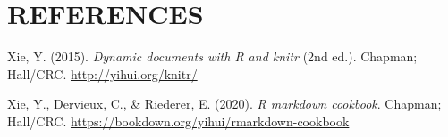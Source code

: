 \documentclass{source/tex/templates/maththesis}
\newlength{\cslhangindent}
\newenvironment{CSLReferences}[2] %
 {%
  \setlength{\parindent}{0pt}
  \ifodd #1
  \let\oldpar\par
  \def\par{\hangindent=\cslhangindent\oldpar}
  \fi
  \setlength{\parskip}{1mm}
  \setlength{\baselineskip}{6mm}
 }%
 {}
\begin{document}
\hypertarget{references}{%
\chapter*{REFERENCES}\label{references}}

\hypertarget{refs}{}
\begin{CSLReferences}{1}{0}
\leavevmode{}%
Xie, Y. (2015). \emph{Dynamic documents with {R} and knitr} (2nd ed.). Chapman; Hall/CRC. \url{http://yihui.org/knitr/}

\leavevmode{}%
Xie, Y., Dervieux, C., \& Riederer, E. (2020). \emph{R markdown cookbook}. Chapman; Hall/CRC. \url{https://bookdown.org/yihui/rmarkdown-cookbook}

\end{CSLReferences}

\end{document}
